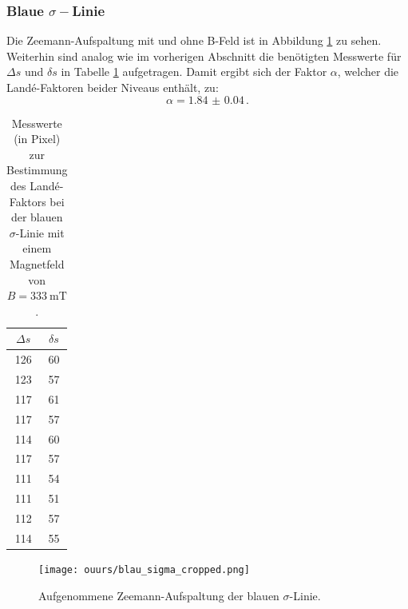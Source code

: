 \FloatBarrier
\subsubsection{Blaue \texorpdfstring{$\sigma-$}ALinie}
	Die Zeemann-Aufspaltung mit und ohne B-Feld ist in Abbildung \ref{fig:blau_sigma}
	zu sehen. Weiterhin sind analog wie im vorherigen Abschnitt die benötigten Messwerte
	für $\Delta s$ und $\delta s$ in Tabelle \ref{tab:blau_sigma} aufgetragen.
	Damit ergibt sich der Faktor $\alpha$, welcher die Landé-Faktoren beider Niveaus enthält, zu:
	\begin{equation*}
		\alpha = \SI{1.84(4)} \, \text{.}
	\end{equation*}
	\begin{table}
		\centering
		\caption{Messwerte (in Pixel) zur Bestimmung des Landé-Faktors bei der blauen $\sigma$-Linie mit einem Magnetfeld von $B = \SI{333}{\milli\tesla}$.}
		\label{tab:blau_sigma}
		\begin{tabular}{c | c}
			\toprule
			$\Delta s$ & $\delta s$\\
			\midrule
			126 & 60 \\
			123 & 57 \\
			117 & 61 \\
			117 & 57 \\
			114 & 60 \\
			117 & 57 \\
			111 & 54 \\
			111 & 51 \\
			112 & 57 \\
			114 & 55 \\
			\bottomrule
		\end{tabular}
	\end{table}
	\begin{figure}
	\centering
	\texttt{[image: ouurs/blau\_sigma\_cropped.png]}
	\caption{Aufgenommene Zeemann-Aufspaltung der blauen $\sigma$-Linie.}
	\label{fig:blau_sigma}
\end{figure}

\FloatBarrier
